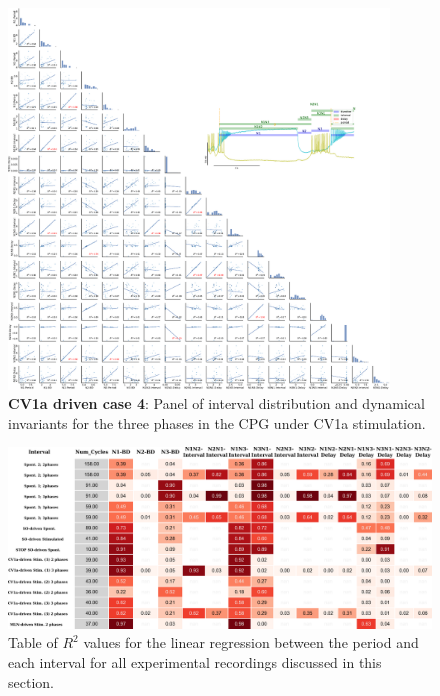 \begin{figure}[htbp]
	\centering
	\includegraphics[width=0.9\textwidth]{./img/invariants/data/SUSSEX/CV1a_driven4/images/3phases/panel_with_pairplot.pdf}
	\caption{\textbf{CV1a driven case 4}: Panel of interval distribution and dynamical invariants for the three phases in the CPG under CV1a stimulation.}
	\label{fig:cv1a 4 3phases pairplot}
\end{figure}



\begin{figure}
	\includegraphics[width=\textwidth]{./img/invariants/styled_table_invariants_prettyprint.pdf}
	\caption{Table of $R^2$ values for the linear regression between the period and each interval for all experimental recordings discussed in this section.}
	\label{fig:R2 table}
\end{figure}
